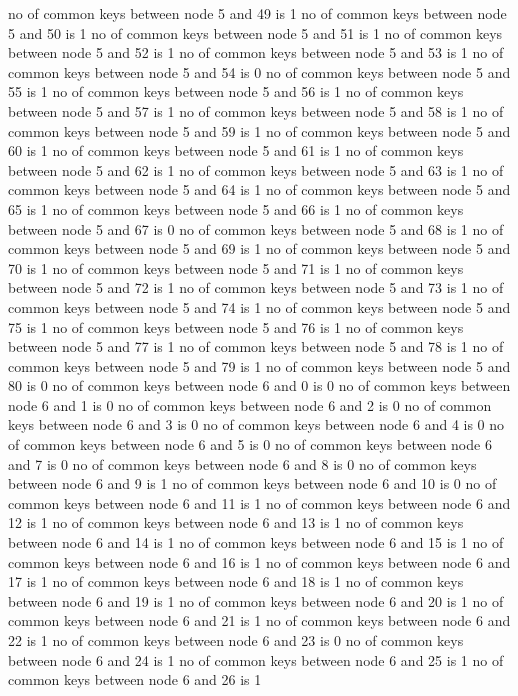 no of common keys between node 5 and 49 is 1
no of common keys between node 5 and 50 is 1
no of common keys between node 5 and 51 is 1
no of common keys between node 5 and 52 is 1
no of common keys between node 5 and 53 is 1
no of common keys between node 5 and 54 is 0
no of common keys between node 5 and 55 is 1
no of common keys between node 5 and 56 is 1
no of common keys between node 5 and 57 is 1
no of common keys between node 5 and 58 is 1
no of common keys between node 5 and 59 is 1
no of common keys between node 5 and 60 is 1
no of common keys between node 5 and 61 is 1
no of common keys between node 5 and 62 is 1
no of common keys between node 5 and 63 is 1
no of common keys between node 5 and 64 is 1
no of common keys between node 5 and 65 is 1
no of common keys between node 5 and 66 is 1
no of common keys between node 5 and 67 is 0
no of common keys between node 5 and 68 is 1
no of common keys between node 5 and 69 is 1
no of common keys between node 5 and 70 is 1
no of common keys between node 5 and 71 is 1
no of common keys between node 5 and 72 is 1
no of common keys between node 5 and 73 is 1
no of common keys between node 5 and 74 is 1
no of common keys between node 5 and 75 is 1
no of common keys between node 5 and 76 is 1
no of common keys between node 5 and 77 is 1
no of common keys between node 5 and 78 is 1
no of common keys between node 5 and 79 is 1
no of common keys between node 5 and 80 is 0
no of common keys between node 6 and 0 is 0
no of common keys between node 6 and 1 is 0
no of common keys between node 6 and 2 is 0
no of common keys between node 6 and 3 is 0
no of common keys between node 6 and 4 is 0
no of common keys between node 6 and 5 is 0
no of common keys between node 6 and 7 is 0
no of common keys between node 6 and 8 is 0
no of common keys between node 6 and 9 is 1
no of common keys between node 6 and 10 is 0
no of common keys between node 6 and 11 is 1
no of common keys between node 6 and 12 is 1
no of common keys between node 6 and 13 is 1
no of common keys between node 6 and 14 is 1
no of common keys between node 6 and 15 is 1
no of common keys between node 6 and 16 is 1
no of common keys between node 6 and 17 is 1
no of common keys between node 6 and 18 is 1
no of common keys between node 6 and 19 is 1
no of common keys between node 6 and 20 is 1
no of common keys between node 6 and 21 is 1
no of common keys between node 6 and 22 is 1
no of common keys between node 6 and 23 is 0
no of common keys between node 6 and 24 is 1
no of common keys between node 6 and 25 is 1
no of common keys between node 6 and 26 is 1
